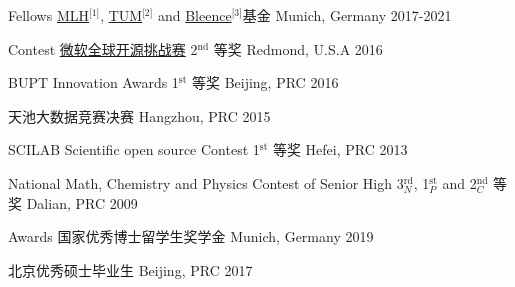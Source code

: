 




\begin{cvhonors}


\cvhonor
{Fellows} %
{\href{https://fellowship.mlh.io/}{MLH}$^{\text{[1]}}$, \href{}{TUM}$^{\text{[2]}}$ and \href{https://bleenco.com/}{Bleence}$^{\text{[3]}}$基金} %
{Munich, Germany} %
{2017-2021} %


\cvhonor
{Contest} %
{\href{https://www.microsoft.com/en-us/research/academic-program/microsoft-open-source-challenge/}{微软全球开源挑战赛} 2$^\text{nd}$ 等奖} %
{Redmond, U.S.A} %
{2016} %

\cvhonor
{} %
{BUPT Innovation Awards 1$^\text{st}$ 等奖} %
{Beijing, PRC} %
{2016} %

\cvhonor
{} %
{天池大数据竞赛决赛} %
{Hangzhou, PRC} %
{2015} %


\cvhonor
{} %
{SCILAB Scientific open source Contest 1$^\text{st}$ 等奖} %
{Hefei, PRC} %
{2013} %


\cvhonor
{} %
{National Math, Chemistry and Physics Contest of Senior High 3$^\text{rd}_N$, 1$^\text{st}_P$ and 2$^\text{nd}_C$ 等奖} %
{Dalian, PRC} %
{2009} %

\cvhonor
{Awards} %
{国家优秀博士留学生奖学金} %
{Munich, Germany} %
{2019} %

\cvhonor
{} %
{北京优秀硕士毕业生} %
{Beijing, PRC} %
{2017} %


\end{cvhonors}

